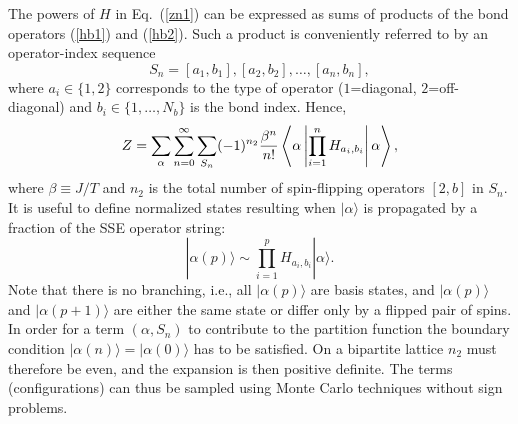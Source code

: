 \documentclass[10pt,pre,aps,twocolumn,showpacs,superscriptaddress,
floatfix]{revtex4}
\begin{document}
The powers of $H$ in Eq.~(\ref{zn1}) can be expressed as sums of 
products of the bond operators (\ref{hb1}) and (\ref{hb2}). Such a 
product is conveniently referred to by an operator-index sequence 
\begin{equation}
S_n = [a_1,b_1],[a_2,b_2],\ldots,[a_n,b_n],
\end{equation}
where $a_i \in \lbrace 1,2\rbrace$ corresponds to the type of operator 
($1$=diagonal, $2$=off-diagonal) and $b_i \in \lbrace 1,\ldots,N_b\rbrace$
is the bond index. Hence, 
\begin{eqnarray}
Z = \sum\limits_\alpha\sum\limits_{n=0}^\infty \sum_{S_n} 
     (-1)^{n_2}{\beta^n \over n!} 
     \left \langle \alpha \left | \prod_{i=1}^n H_{a_i,b_i} 
     \right | \alpha \right \rangle ,
\label{zn2}
\end{eqnarray}
where $\beta\equiv J/T$ and $n_2$ is the total number of spin-flipping 
operators $[2,b]$ in $S_n$. 
It is useful to define normalized states 
resulting when $|\alpha \rangle$ is propagated by a fraction of the SSE 
operator string: \begin{equation}
|\alpha (p)\rangle \sim \prod\limits_{i=1}^p H_{a_i,b_i} |\alpha\rangle .
\label{prop}
\end{equation}
Note that there is no branching, i.e., all $|\alpha (p)\rangle$ are basis 
states, and $|\alpha (p)\rangle$ and $|\alpha (p+1)\rangle$ are either the 
same state or differ only by a flipped pair of spins. In order for a term
$(\alpha,S_n)$ to contribute to the partition function the boundary condition 
$|\alpha (n)\rangle = |\alpha (0)\rangle$ has to be satisfied. On a bipartite 
lattice $n_2$ must therefore be even, and the expansion is then
positive definite. The terms (configurations) can thus be sampled using 
Monte Carlo techniques without sign problems. 
\end{document}

